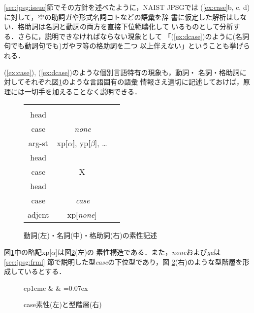 \ref{sec:jpsg:issue}節でその方針を述べたように，NAIST JPSGでは
(\ref{ex:case}b, c, d)に対して，空の助詞ガや形式名詞コトなどの語彙を辞
書に仮定した解析はしない．格助詞は名詞と動詞の両方を直接下位範疇化して
いるものとして分析する．さらに，説明できなければならない現象として
「(\ref{ex:dcase})のように(名詞句でも動詞句でも)ガやヲ等の格助詞を二つ
以上伴えない」ということも挙げられる．

(\ref{ex:case}), (\ref{ex:dcase})のような個別言語特有の現象も，動詞・
名詞・格助詞に対してそれぞれ図\ref{fig:lexicon}のような言語固有の語彙
情報さえ適切に記述しておけば，原理には一切手を加えることなく説明できる．
\begin{figure}
\begin{center}
\begin{tabular}{ccc}
 \begin{avm}
  \[\footnotesize\it{word}\\
    head & \[\footnotesize\it{verb}\\
             case & {\it none\/}\]\\
    arg-st & \<xp[$\alpha$], yp[$\beta$], \dots \>\,
  \]
 \end{avm} &
 \begin{avm}
  \[\footnotesize\it{word}\\
    head & \[\footnotesize\it{noun}\\
             case & X\]\,\]
 \end{avm} &
 \begin{avm}
  \[\footnotesize\it{word}\\
    head & \[\footnotesize\it{ptcl}\\
             case & {\it case\/}\]\\
    adjcnt & \<xp[{\it none\/}]\>\,
  \]
 \end{avm}
\end{tabular} 
\end{center}
\caption{動詞(左)・名詞(中)・格助詞(右)の素性記述}\label{fig:lexicon}
\end{figure}
図\ref{fig:lexicon}中の略記{\sc xp[$\alpha$]}は図\ref{fig:abbr}(左)の
素性構造である．また，{\it none\/}および{\it ga\/}は
\ref{sec:jpsg:frml} 節で説明した型{\it case\/}の下位型であり，図
\ref{fig:abbr}(右)のような型階層を形成しているとする．
\begin{figure}
\begin{center}
\begin{tabular}{cp{1cm}c}
& &
\unitlength=0.07ex
\end{tabular}
\end{center}
\caption{{\sc case}素性(左)と型階層(右)}\label{fig:abbr}
\end{figure}
